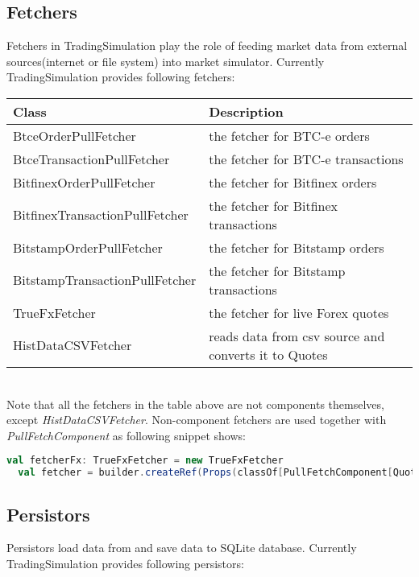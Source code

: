 \subsection{Fetchers}

Fetchers in TradingSimulation play the role of feeding market data from external sources(internet or file system) into market simulator. Currently TradingSimulation provides following fetchers:\\

\noindent
\begin{tabularx}{\textwidth}{|l|X|}
  \hline
  Class & Description  \\
  \hline
  BtceOrderPullFetcher & the fetcher for BTC-e orders \\
  \hline
  BtceTransactionPullFetcher  & the fetcher for BTC-e transactions  \\
  \hline
  BitfinexOrderPullFetcher & the fetcher for Bitfinex orders  \\
  \hline
  BitfinexTransactionPullFetcher & the fetcher for Bitfinex transactions  \\
  \hline
  BitstampOrderPullFetcher & the fetcher for Bitstamp orders  \\
  \hline
  BitstampTransactionPullFetcher & the fetcher for Bitstamp transactions \\
  \hline
  TrueFxFetcher & the fetcher for  live Forex quotes  \\
  \hline
  HistDataCSVFetcher & reads data from csv source and converts it to Quotes \\
  \hline
\end{tabularx}\\[0.3cm]

Note that all the fetchers in the table above are not components themselves, except \emph{HistDataCSVFetcher}. Non-component fetchers are used together with \emph{PullFetchComponent} as following snippet shows:

\begin{lstlisting}[language=Scala]
  val fetcherFx: TrueFxFetcher = new TrueFxFetcher
  val fetcher = builder.createRef(Props(classOf[PullFetchComponent[Quote]], fetcherFx, implicitly[ClassTag[Quote]]), "TrueFxFetcher")
\end{lstlisting}

\subsection{Persistors}

Persistors load data from and save data to SQLite database. Currently TradingSimulation provides following persistors:

